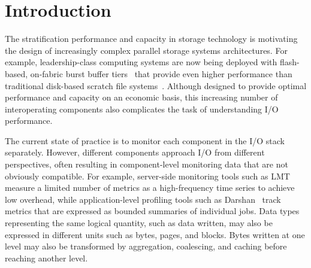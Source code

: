 \section{Introduction} \label{sec:introduction}



The stratification performance and capacity in storage technology is 
motivating the design of increasingly complex parallel storage systems architectures.  For
example, leadership-class computing systems are now being deployed with
flash-based, on-fabric burst buffer tiers~\cite{Henseler2016} that provide even higher performance
than traditional disk-based scratch file systems~\cite{Bhimji2016}.  Although designed to provide optimal performance and
capacity on an economic basis, this increasing number of interoperating
components also complicates the task of understanding I/O performance.


The current state of practice is to monitor each component in the I/O stack
separately.  However, different components approach I/O from different
perspectives, often resulting in component-level monitoring data that are not
obviously compatible.  For example, server-side monitoring tools such as
LMT~\cite{lmt} measure a limited number of metrics as a high-frequency time
series to achieve
low overhead, while application-level profiling tools such as
Darshan~\cite{carns200924} track metrics that are expressed as bounded
summaries of individual jobs.
Data types representing the same logical
quantity, such as data written, may also be expressed in different units such
as bytes, pages, and blocks.  Bytes written at one level may also be
transformed by aggregation, coalescing, and caching before reaching another
level.


